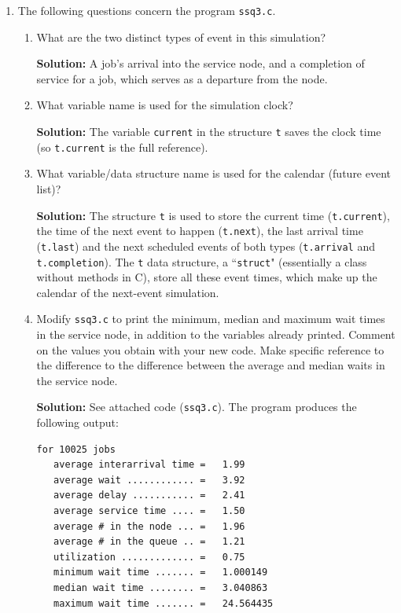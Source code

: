 \documentclass[11pt]{article} %
\begin{document}
\begin{enumerate}
\item The following questions concern the program \texttt{ssq3.c}.

\begin{enumerate}

\item What are the two distinct types of event in this simulation?

{\bf Solution:} A job's arrival into the service node, and a completion of service for a job, which serves as a departure from the node.

\item What variable name is used for the simulation clock?

{\bf Solution:} The variable \texttt{current} in the structure \texttt{t} saves the clock time (so \texttt{t.current} is the full reference).

\item What variable/data structure name is used for the calendar (future event list)?

{\bf Solution:} The structure \texttt{t} is used to store the current time (\texttt{t.current}), the time of the next event to happen (\texttt{t.next}), the last arrival time (\texttt{t.last}) and the next scheduled events of both types (\texttt{t.arrival} and \texttt{t.completion}).  The \texttt{t} data structure, a ``\texttt{struct}" (essentially a class without methods in C), store all these event times, which make up the calendar of the next-event simulation.

\item Modify \texttt{ssq3.c} to print the minimum, median and maximum wait times in the service node, in addition to the variables already printed.  Comment on the values you obtain with your new code.  Make specific reference to the difference to the difference between the average and median waits in the service node.

{\bf Solution:} See attached code (\texttt{ssq3.c}).  The program produces the following output:

\begin{verbatim}for 10025 jobs
   average interarrival time =   1.99
   average wait ............ =   3.92
   average delay ........... =   2.41
   average service time .... =   1.50
   average # in the node ... =   1.96
   average # in the queue .. =   1.21
   utilization ............. =   0.75
   minimum wait time ....... =   1.000149
   median wait time ........ =   3.040863
   maximum wait time ....... =   24.564435\end{verbatim}
   

\end{enumerate}
\end{enumerate}
\end{document}
